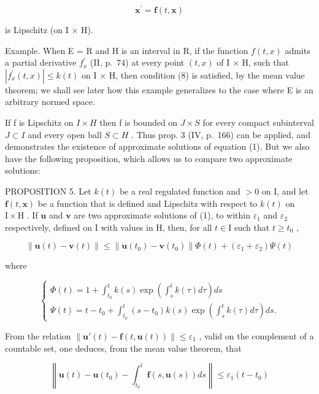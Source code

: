 \[
\mathbf {x} ^ {\prime} = \mathbf {f} (t, \mathbf {x})\tag{1}
\]

is Lipschitz (on I × H).

Example. When E = R and H is an interval in R, if the function \(f(t, x)\) admits a partial derivative \(f_{x}^{\prime}\) (II, p.~74) at every point \((t, x)\) of I × H, such that \(|f_{x}^{\prime}(t, x)| \leqslant k(t)\) on I × H, then condition (8) is satisfied, by the mean value theorem; we shall see later how this example generalizes to the case where E is an arbitrary normed space.

If f is Lipschitz on \(I \times H\) then f is bounded on \(J \times S\) for every compact subinterval \(J \subset I\) and every open ball \(S \subset H\) . Thus prop. 3 (IV, p.~166) can be applied, and demonstrates the existence of approximate solutions of equation (1). But we also have the following proposition, which allows us to compare two approximate solutions:

PROPOSITION 5. Let \(k(t)\) be a real regulated function and \(>0\) on I, and let \(\mathbf{f}(t, \mathbf{x})\) be a function that is defined and Lipschitz with respect to \(k(t)\) on \(\mathrm{I} \times \mathrm{H}\) . If \(\mathbf{u}\) and \(\mathbf{v}\) are two approximate solutions of (1), to within \(\varepsilon_1\) and \(\varepsilon_2\) respectively, defined on I with values in H, then, for all \(t \in \mathrm{I}\) such that \(t \geqslant t_0\) ,

\[
\left\| \mathbf {u} (t) - \mathbf {v} (t) \right\| \leqslant \left\| \mathbf {u} \left(t _ {0}\right) - \mathbf {v} \left(t _ {0}\right) \right\| \Phi (t) + \left(\varepsilon_ {1} + \varepsilon_ {2}\right) \Psi (t)\tag{9}
\]

where

\[
\left\{ \begin{array}{l} \Phi (t) = 1 + \int_ {t _ {0}} ^ {t} k (s) \exp \left(\int_ {s} ^ {t} k (\tau) d \tau\right) d s \\ \Psi (t) = t - t _ {0} + \int_ {t _ {0}} ^ {t} (s - t _ {0}) k (s) \exp \left(\int_ {s} ^ {t} k (\tau) d \tau\right) d s. \end{array} \right.\tag{10}
\]

From the relation \(\left\| \mathbf{u}'(t) - \mathbf{f}(t, \mathbf{u}(t)) \right\| \leqslant \varepsilon_1\) , valid on the complement of a countable set, one deduces, from the mean value theorem, that

\[
\left\| \mathbf {u} (t) - \mathbf {u} (t _ {0}) - \int_ {t _ {0}} ^ {t} \mathbf {f} (s, \mathbf {u} (s)) d s \right\| \leqslant \varepsilon_ {1} (t - t _ {0})
\]

